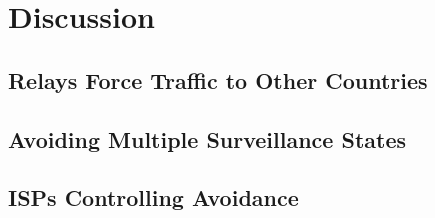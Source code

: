 \section{Discussion}
\label{discussion}

\subsection{Relays Force Traffic to Other Countries}

\subsection{Avoiding Multiple Surveillance States}

\subsection{ISPs Controlling Avoidance}
